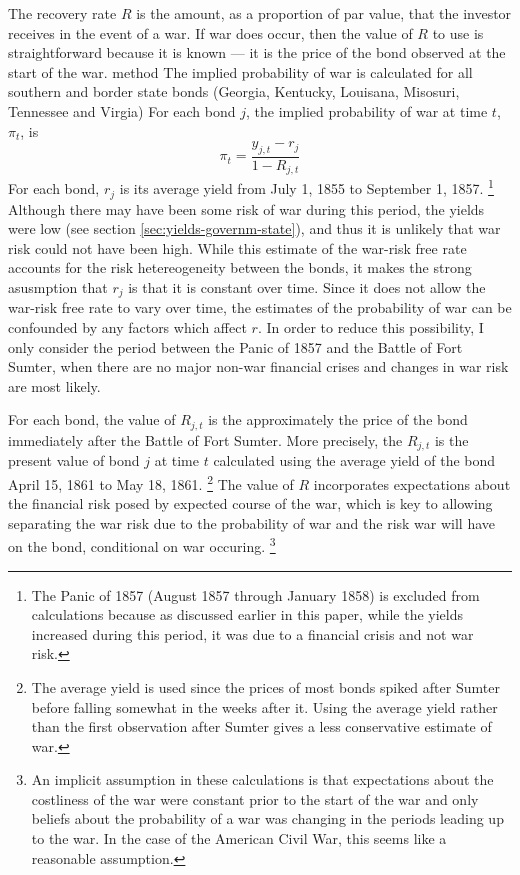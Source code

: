 \documentclass[11pt, oneside, article]{memoir}\usepackage[]{graphicx}\usepackage[]{color}
\begin{document}
The recovery rate $R$ is the amount, as a proportion of par value, that the investor receives in the event of a war.
If war does occur, then the value of $R$ to use is straightforward because it is known --- it is the price of the bond observed at the start of the war.
 method The implied probability of war is calculated for all southern and border state bonds (Georgia, Kentucky, Louisana, Misosuri, Tennessee and Virgia)
For each bond $j$, the implied probability of war at time $t$, $\pi_{t}$, is
\begin{equation}
  \pi_{t} = \frac{y_{j,t} - r_{j}}{1 - R_{j,t}}
\end{equation}
For each bond, $r_{j}$ is its average yield from July  1, 1855 to September  1, 1857.%
\footnote{
  The Panic of 1857 (August 1857 through January 1858) is excluded from calculations because as discussed earlier in this paper, while the yields increased during this period, it was due to a financial crisis and not war risk.
}
Although there may have been some risk of war during this period, the yields were low (see section \ref{sec:yields-governm-state}), and thus it is unlikely that war risk could not have been high.
While this estimate of the war-risk free rate accounts for the risk hetereogeneity between the bonds, it makes the strong asusmption that $r_{j}$ is that it is constant over time.
Since it does not allow the war-risk free rate to vary over time, the estimates of the probability of war can be confounded by any factors which affect $r$.
In order to reduce this possibility, I only consider the period between the Panic of 1857 and the Battle of Fort Sumter, when there are no major non-war financial crises and changes in war risk are most likely.

For each bond, the value of $R_{j,t}$ is the approximately the price of the bond immediately after the Battle of Fort Sumter.
More precisely, the $R_{j,t}$ is the present value of bond $j$ at time $t$ calculated using the average yield of the bond April 15, 1861 to May 18, 1861.%
\footnote{The average yield is used since the prices of most bonds spiked after Sumter before falling somewhat in the weeks after it.
  Using the average yield rather than the first observation after Sumter gives a less conservative estimate of war.
}
The value of $R$ incorporates expectations about the financial risk posed by expected course of the war, which is key to allowing separating the war risk due to the probability of war and the risk war will have on the bond, conditional on war occuring.%
\footnote{
  An implicit assumption in these calculations is that expectations about the costliness of the war were constant prior to the start of the war and only beliefs about the probability of a war was changing in the periods leading up to the war.
  In the case of the American Civil War, this seems like a reasonable assumption.
}
\end{document}
